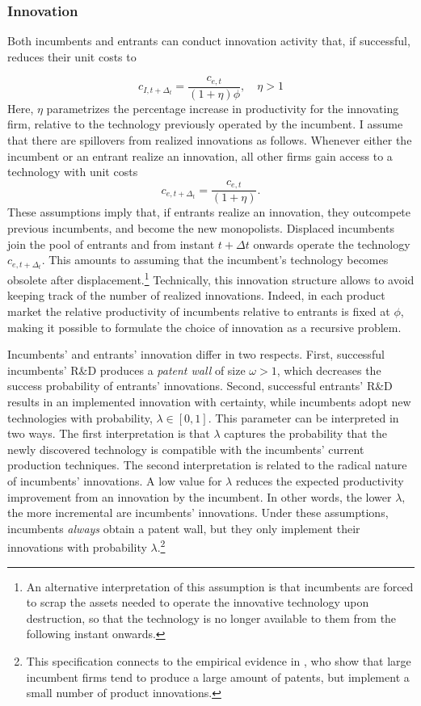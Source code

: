 \subsubsection{Innovation}

Both incumbents and entrants can conduct innovation activity that,
if successful, reduces their unit costs to

\[
c_{I,t+\Delta_{t}}=\frac{c_{e,t}}{\left(1+\eta\right)\phi},\quad\eta>1
\]
Here, $\eta$ parametrizes the percentage increase in productivity
for the innovating firm, relative to the technology previously operated
by the incumbent. I assume that there are spillovers from realized
innovations as follows. Whenever either the incumbent or an entrant
realize an innovation, all other firms gain access to a technology
with unit costs
\[
c_{e,t+\Delta_{t}}=\frac{c_{e,t}}{\left(1+\eta\right)}.
\]
These assumptions imply that, if entrants realize an innovation, they
outcompete previous incumbents, and become the new monopolists. Displaced
incumbents join the pool of entrants and from instant $t+\Delta t$
onwards operate the technology $c_{e,t+\Delta_{t}}$. This amounts
to assuming that the incumbent's technology becomes obsolete after
displacement.\footnote{An alternative interpretation of this assumption is that incumbents
are forced to scrap the assets needed to operate the innovative technology
upon destruction, so that the technology is no longer available to
them from the following instant onwards. } Technically, this innovation structure allows to avoid keeping track
of the number of realized innovations. Indeed, in each product market
the relative productivity of incumbents relative to entrants is fixed
at $\phi$, making it possible to formulate the choice of innovation
as a recursive problem.

Incumbents' and entrants' innovation differ in two respects. First,
successful incumbents' R\&D produces a \emph{patent wall }of size
$\omega>1$, which decreases the success probability of entrants'
innovations. Second, successful entrants' R\&D results in an implemented
innovation with certainty, while incumbents adopt new technologies
with probability, $\lambda\in[0,1].$ This parameter can be interpreted
in two ways. The first interpretation is that $\lambda$ captures
the probability that the newly discovered technology is compatible
with the incumbents' current production techniques. The second interpretation
is related to the radical nature of incumbents' innovations. A low
value for $\lambda$ reduces the expected productivity improvement
from an innovation by the incumbent. In other words, the lower $\lambda,$
the more incremental are incumbents' innovations. Under these assumptions,
incumbents \emph{always} obtain a patent wall, but they only implement
their innovations with probability $\lambda$.\footnote{This specification connects to the empirical evidence in \citet{argentePatentsProductsProduct2020a},
who show that large incumbent firms tend to produce a large amount
of patents, but implement a small number of product innovations.}

